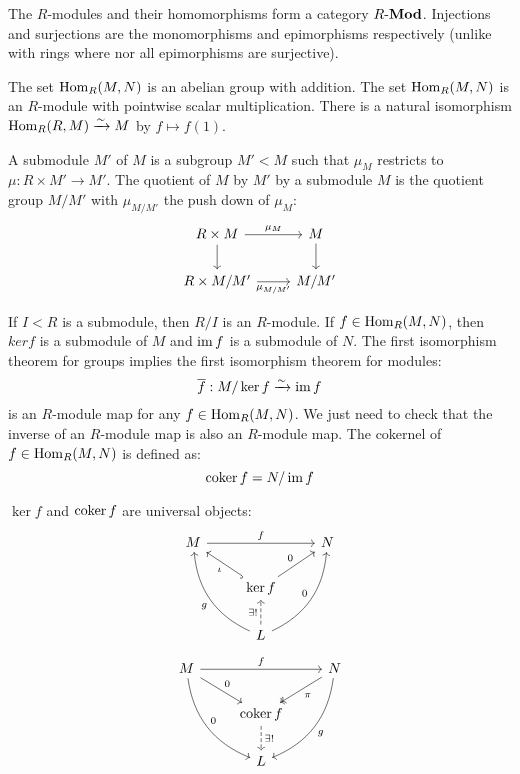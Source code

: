 \begin{rmk}
	The $R$-modules and their homomorphisms form a category $R\mbox{-}\mathbf{Mod}$.
	Injections and surjections are the monomorphisms and epimorphisms respectively (unlike with rings where nor all epimorphisms are surjective).
\end{rmk}

\begin{prop}[1.3]
	\begin{enum}
		\io The set $\operatorname{Hom}_R(M,N)$ is an abelian group with addition.
		\io The set $\operatorname{Hom}_R(M,N)$ is an $R$-module with pointwise scalar multiplication.
		\io There is a natural isomorphism $\operatorname{Hom}_R(R,M) \xrightarrow{\sim} M$ by $f \mapsto f(1)$.
	\end{enum}
\end{prop}

\begin{defn}[1.4]
	\begin{enum}
		\io A submodule $M'$ of $M$ is a subgroup $M'<M$ such that $\mu_M$ restricts to $\mu: R \times M' \to M'$.
		\io The quotient of $M$ by $M'$ by a submodule $M$ is the quotient group $M/M'$ with $\mu_{M/M'}$ the push down of $\mu_M$:
		\[
			\begin{tikzcd}
				R \times M \arrow[r, "\mu_M"] \arrow[d] & M \arrow[d] \\
				R \times M/M' \arrow[r, "\mu_{M/M'}"'] & M/M'
			\end{tikzcd}
		\]
	\end{enum}
\end{defn}

\begin{exam}
	\begin{enum}
		\io If $I<R$ is a submodule, then $R/I$ is an $R$-module.
		\io If $f \in \operatorname{Hom}_R(M,N)$, then $ker f$ is a submodule of $M$ and $\operatorname{im} f$ is a submodule of $N$.
		\io The first isomorphism theorem for groups implies the first isomorphism theorem for modules:
		\[\overline{f}: M/\ker f \xrightarrow{\sim} \operatorname{im} f\]
		is an $R$-module map for any $f \in \operatorname{Hom}_R(M,N)$.
		We just need to check that the inverse of an $R$-module map is also an $R$-module map.
		\io The cokernel of $f \in \operatorname{Hom}_R(M,N)$ is defined as:
		\[\operatorname{coker} f = N/\operatorname{im} f\]
	\end{enum}
\end{exam}

\begin{rmk}
	$\ker f$ and $\operatorname{coker} f$ are universal objects:
	\[
		\begin{tikzcd}
			M \arrow[rr, "f"] & & N \\
			& \ker f \arrow[ul, hook, "\iota"] \arrow[ur, "0"] & \\
			& L \arrow[uul, bend left, "g"] \arrow[uur, bend right, "0"] \arrow[u, dashed, "\exists !"] &
		\end{tikzcd}
	\]
	\[
		\begin{tikzcd}
			M \arrow[rr, "f"] \arrow[dr, "0"] \arrow[ddr, bend right, "0"] & & N \arrow[dl, twoheadrightarrow, "\pi"] \arrow[ddl, bend left, "g"] \\
			& \coker f \arrow[d, dashed, "\exists !"] & \\
			& L &
		\end{tikzcd}
	\]
\end{rmk}